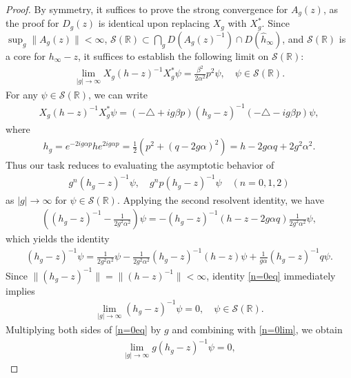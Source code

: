 \documentclass[10pt,a4paper]{amsart}
\newcommand{\RR}{\mathbb{R}}
\begin{document}
\begin{proof}
By symmetry, it suffices to prove the strong convergence for $A_g(z)$, as the proof for $D_g(z)$ is identical upon replacing $X_g$ with $X_g^\ast$.
Since $\sup_{g} \| A_g(z) \| < \infty$, ${\mathscr S}(\RR) \subset \bigcap_g D(A_g(z)^{-1}) \cap D(\hat{h}_\infty)$, and ${\mathscr S}(\RR)$ is a core for $h_{\infty} - z$, it suffices to establish the following limit on ${\mathscr S}(\RR)$:
\begin{align*}
    \lim_{|g|\to\infty} X_g (h - z)^{-1} X_g^\ast \psi 
    = \frac{\beta^2}{2\alpha^2} p^2 \psi, 
    \quad \psi \in {\mathscr S}(\RR).
\end{align*}
For any $\psi \in {\mathscr S}(\RR)$, we can write
\begin{align*}
    X_g (h - z)^{-1} X_g^\ast \psi
    = (-\triangle + ig\beta p) (h_g - z)^{-1} (-\triangle - ig\beta p) \psi,
\end{align*}
where 
\begin{align}h_g = e^{-2ig\alpha p} h e^{2ig\alpha p} = \frac12 (p^2 + (q - 2g\alpha)^2) = h - 2g\alpha q + 2g^2\alpha^2.\end{align} 
Thus our task reduces to evaluating the asymptotic behavior of
\begin{align*}
    g^n (h_g - z)^{-1}\psi, \quad g^n p (h_g - z)^{-1} \psi \quad (n = 0, 1, 2)
\end{align*}
as $|g| \to \infty$ for $\psi \in {\mathscr S}(\RR)$. Applying the second resolvent identity, we have
\begin{align*}
    \left( (h_g - z)^{-1} - \frac{1}{2g^2\alpha^2} \right) \psi
    = -(h_g - z)^{-1} (h - z - 2g\alpha q) \frac{1}{2g^2\alpha^2} \psi,
\end{align*}
which yields the identity
\begin{align}\label{n=0eq}
    (h_g - z)^{-1} \psi
    = \frac{1}{2g^2\alpha^2} \psi 
    - \frac{1}{2g^2\alpha^2} (h_g - z)^{-1} (h - z) \psi
    + \frac{1}{g\alpha} (h_g - z)^{-1} q\psi.
\end{align}
Since $\| (h_g - z)^{-1} \| = \| (h - z)^{-1} \| < \infty$, identity \eqref{n=0eq} immediately implies
\begin{align}\label{n=0lim}
    \lim_{|g|\to\infty} (h_g - z)^{-1} \psi = 0, 
    \quad 
    \psi \in {\mathscr S}(\RR).
\end{align}
Multiplying both sides of \eqref{n=0eq} by $g$ and combining with \eqref{n=0lim}, we obtain
\begin{align}\label{n=1lim}
    \lim_{|g|\to\infty} g (h_g - z)^{-1} \psi = 0, 

\end{align}
\end{proof}
\end{document}
